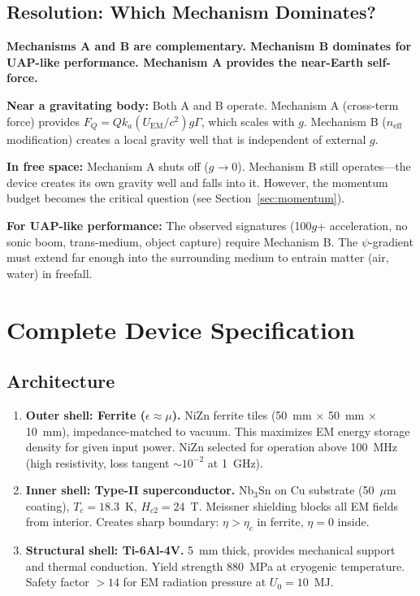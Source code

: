 \documentclass[12pt,aps,prd,superscriptaddress,nofootinbib,longbibliography]{revtex4-2}
\newcommand{\neff}{n_{\mathrm{eff}}}
\newcommand{\ka}{k_a}
\newcommand{\etac}{\eta_c}
\begin{document}
\subsection{Resolution: Which Mechanism Dominates?}

\begin{tcolorbox}[colback=green!5!white, colframe=green!50!black,
  title=The Answer to the Critical Question]
\textbf{Mechanisms A and B are complementary.  Mechanism B dominates
for UAP-like performance.  Mechanism A provides the near-Earth
self-force.}

\smallskip
\textbf{Near a gravitating body:} Both A and B operate.  Mechanism A
(cross-term force) provides $F_Q = Q \ka (U_{\mathrm{EM}}/c^2) g \Gamma$,
which scales with $g$.  Mechanism B ($\neff$ modification) creates a
local gravity well that is independent of external $g$.

\smallskip
\textbf{In free space:} Mechanism A shuts off ($g \to 0$).
Mechanism B still operates---the device creates its own gravity well and
falls into it.  However, the momentum budget becomes the critical
question (see Section~\ref{sec:momentum}).

\smallskip
\textbf{For UAP-like performance:} The observed signatures (100$g$+
acceleration, no sonic boom, trans-medium, object capture) require
Mechanism B.  The $\psi$-gradient must extend far enough into the
surrounding medium to entrain matter (air, water) in freefall.
\end{tcolorbox}


\section{Complete Device Specification}\label{sec:device-spec}

\subsection{Architecture}

\begin{enumerate}
\item \textbf{Outer shell: Ferrite ($\epsilon \approx \mu$).}
NiZn ferrite tiles (50~mm $\times$ 50~mm $\times$ 10~mm), impedance-matched
to vacuum.  This maximizes EM energy storage density for given input
power.  NiZn selected for operation above 100~MHz (high resistivity,
loss tangent $\sim 10^{-2}$ at 1~GHz).

\item \textbf{Inner shell: Type-II superconductor.}
Nb$_3$Sn on Cu substrate (50~$\mu$m coating), $T_c = 18.3$~K,
$H_{c2} = 24$~T.  Meissner shielding blocks all EM fields from interior.
Creates sharp boundary: $\eta > \etac$ in ferrite, $\eta = 0$ inside.

\item \textbf{Structural shell: Ti-6Al-4V.}
5~mm thick, provides mechanical support and thermal conduction.
Yield strength 880~MPa at cryogenic temperature.  Safety factor $> 14$
for EM radiation pressure at $U_0 = 10$~MJ.
\end{enumerate}
\end{document}
